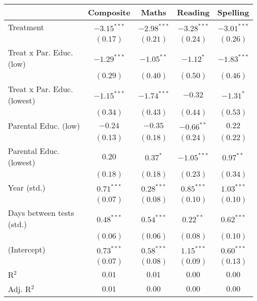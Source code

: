 
\begin{table}
\begin{center}
\begin{tabular}{l c c c c}
\hline
 & Composite & Maths & Reading & Spelling \\
\hline
Treatment                   & $-3.15^{***}$ & $-2.98^{***}$ & $-3.28^{***}$ & $-3.01^{***}$ \\
                            & $(0.17)$      & $(0.21)$      & $(0.24)$      & $(0.26)$      \\
Treat x Par. Educ. (low)    & $-1.29^{***}$ & $-1.05^{**}$  & $-1.12^{*}$   & $-1.83^{***}$ \\
                            & $(0.29)$      & $(0.40)$      & $(0.50)$      & $(0.46)$      \\
Treat x Par. Educ. (lowest) & $-1.15^{***}$ & $-1.74^{***}$ & $-0.32$       & $-1.31^{*}$   \\
                            & $(0.34)$      & $(0.43)$      & $(0.44)$      & $(0.53)$      \\
Parental Educ. (low)        & $-0.24$       & $-0.35$       & $-0.66^{**}$  & $0.22$        \\
                            & $(0.13)$      & $(0.18)$      & $(0.24)$      & $(0.22)$      \\
Parental Educ. (lowest)     & $0.20$        & $0.37^{*}$    & $-1.05^{***}$ & $0.97^{**}$   \\
                            & $(0.18)$      & $(0.18)$      & $(0.23)$      & $(0.34)$      \\
Year (std.)                 & $0.71^{***}$  & $0.28^{***}$  & $0.85^{***}$  & $1.03^{***}$  \\
                            & $(0.07)$      & $(0.08)$      & $(0.10)$      & $(0.10)$      \\
Days between tests (std.)   & $0.48^{***}$  & $0.54^{***}$  & $0.22^{**}$   & $0.62^{***}$  \\
                            & $(0.06)$      & $(0.06)$      & $(0.08)$      & $(0.10)$      \\
(Intercept)                 & $0.73^{***}$  & $0.58^{***}$  & $1.15^{***}$  & $0.60^{***}$  \\
                            & $(0.07)$      & $(0.08)$      & $(0.09)$      & $(0.13)$      \\
\hline
R$^2$                       & $0.01$        & $0.01$        & $0.00$        & $0.00$        \\
Adj. R$^2$                  & $0.01$        & $0.00$        & $0.00$        & $0.00$        \\

\end{tabular}
\end{center}
\end{table}
